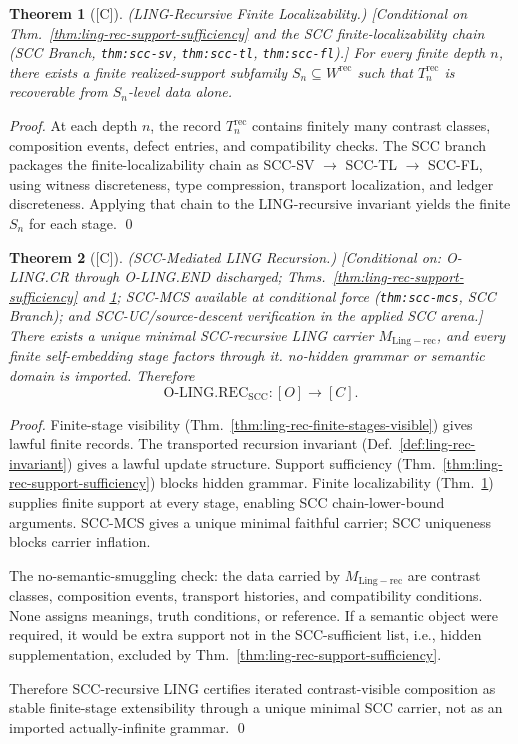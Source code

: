 \documentclass[12pt,oneside]{amsbook}
\theoremstyle{plain}
\newtheorem{theorem}{Theorem}[section]
\theoremstyle{definition}
\theoremstyle{remark}
\newcommand{\status}[1]{\textup{[#1]}}
\begin{document}
\begin{theorem}[\status{C}]\label{thm:ling-rec-finite-localizability}
\textup{(LING-Recursive Finite Localizability.)}
\textup{[Conditional on Thm.~\ref{thm:ling-rec-support-sufficiency}
and the SCC finite-localizability chain (SCC Branch,
\texttt{thm:scc-sv}, \texttt{thm:scc-tl}, \texttt{thm:scc-fl}).]}
For every finite depth $n$, there exists a finite realized-support
subfamily $S_n \subseteq W^{\mathrm{rec}}$ such that $T_n^{\mathrm{rec}}$
is recoverable from $S_n$-level data alone.
\end{theorem}

\begin{proof}
At each depth $n$, the record $T_n^{\mathrm{rec}}$ contains finitely
many contrast classes, composition events, defect entries, and
compatibility checks. The SCC branch packages the finite-localizability
chain as SCC-SV $\to$ SCC-TL $\to$ SCC-FL, using witness discreteness,
type compression, transport localization, and ledger discreteness.
Applying that chain to the LING-recursive invariant yields the finite
$S_n$ for each stage.
\qed
\end{proof}

\begin{theorem}[\status{C}]\label{thm:ling-rec-scc-carrier}
\textup{(SCC-Mediated LING Recursion.)}
\textup{[Conditional on: O-LING.CR through O-LING.END discharged;
Thms.~\ref{thm:ling-rec-support-sufficiency} and
\ref{thm:ling-rec-finite-localizability}; SCC-MCS available at
conditional force (\texttt{thm:scc-mcs}, SCC Branch); and
SCC-UC/source-descent verification in the applied SCC arena.]}
There exists a unique minimal SCC-recursive LING carrier
$M_{\mathrm{Ling-rec}}$, and every finite self-embedding stage
factors through it. no-hidden grammar or semantic domain is imported.
Therefore
\[
 \mathrm{O\text{-}LING.REC}_{\mathrm{SCC}} : [O] \to [C].
\]
\end{theorem}

\begin{proof}
Finite-stage visibility (Thm.~\ref{thm:ling-rec-finite-stages-visible})
gives lawful finite records. The transported recursion invariant
(Def.~\ref{def:ling-rec-invariant}) gives a lawful update structure.
Support sufficiency (Thm.~\ref{thm:ling-rec-support-sufficiency}) blocks
hidden grammar. Finite localizability
(Thm.~\ref{thm:ling-rec-finite-localizability}) supplies finite support
at every stage, enabling SCC chain-lower-bound arguments. SCC-MCS
gives a unique minimal faithful carrier; SCC uniqueness blocks carrier
inflation.

The no-semantic-smuggling check: the data carried by
$M_{\mathrm{Ling-rec}}$ are contrast classes, composition events,
transport histories, and compatibility conditions. None assigns
meanings, truth conditions, or reference. If a semantic object were
required, it would be extra support not in the SCC-sufficient list, i.e.,
hidden supplementation, excluded by Thm.~\ref{thm:ling-rec-support-sufficiency}.

Therefore SCC-recursive LING certifies iterated contrast-visible
composition as stable finite-stage extensibility through a unique
minimal SCC carrier, not as an imported actually-infinite grammar.
\qed
\end{proof}
\end{document}
